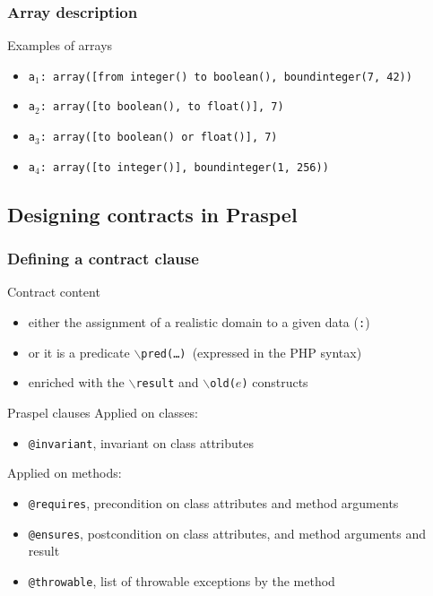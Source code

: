 \documentclass[10pt]{beamer}
\newcommand{\code}[1]{\texttt{#1}}
\begin{document}
\begin{frame}
\frametitle{Array description}

\begin{exampleblock}{Examples of arrays}
\begin{itemize}
\item \code{a$_1$: array([from integer() to boolean(), boundinteger(7, 42))}
\item \code{a$_2$: array([to boolean(), to float()], 7)}
\item \code{a$_3$: array([to boolean() or float()], 7)}
\item \code{a$_4$: array([to integer()], boundinteger(1, 256))}
\end{itemize}
\end{exampleblock}

\end{frame}

\subsection{Designing contracts in Praspel}

\begin{frame}
\frametitle{Defining a contract clause}

\begin{block}{Contract content}
\begin{itemize}
\item either the assignment of a realistic domain to a given data (\code{:})
\item or it is a predicate $\backslash$\code{pred(…) }(expressed in the PHP
syntax)
\item enriched with the $\backslash$\code{result} and
$\backslash$\code{old($e$)} constructs
\end{itemize}
\end{block}

\begin{block}{Praspel clauses}
Applied on classes:
\begin{itemize}
\item \code{@invariant}, invariant on class attributes
\end{itemize}
Applied on methods:
\begin{itemize}
\item \code{@requires}, precondition on class attributes and method arguments
\item \code{@ensures}, postcondition on class attributes, and method arguments
and result
\item \code{@throwable}, list of throwable exceptions by the method
\end{itemize}
\end{block}

\end{frame}
\end{document}
